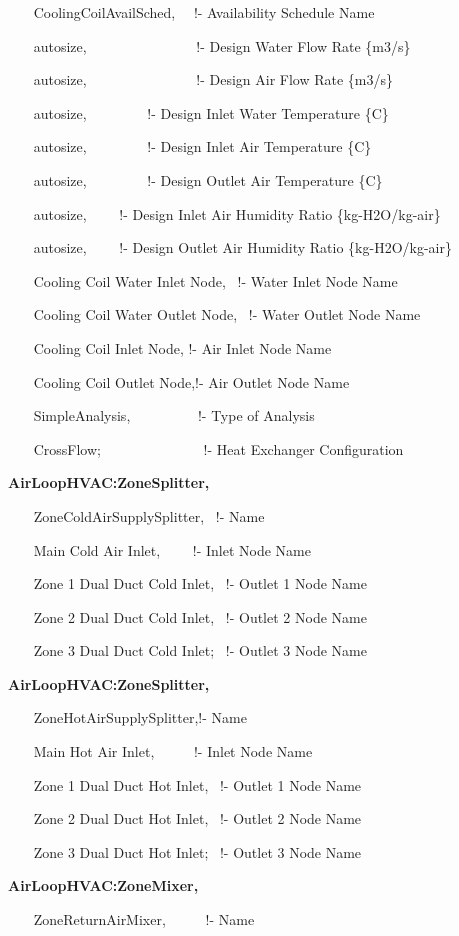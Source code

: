 ~~~ CoolingCoilAvailSched,~~ !- Availability Schedule Name

~~~ autosize,~~~~~~~~~~~~~~~ !- Design Water Flow Rate \{m3/s\}

~~~ autosize,~~~~~~~~~~~~~~~ !- Design Air Flow Rate \{m3/s\}

~~~ autosize,~~~~~~~~ !- Design Inlet Water Temperature \{C\}

~~~ autosize,~~~~~~~~ !- Design Inlet Air Temperature \{C\}

~~~ autosize,~~~~~~~~ !- Design Outlet Air Temperature \{C\}

~~~ autosize,~~~~ !- Design Inlet Air Humidity Ratio \{kg-H2O/kg-air\}

~~~ autosize,~~~~ !- Design Outlet Air Humidity Ratio \{kg-H2O/kg-air\}

~~~ Cooling Coil Water Inlet Node,~ !- Water Inlet Node Name

~~~ Cooling Coil Water Outlet Node,~ !- Water Outlet Node Name

~~~ Cooling Coil Inlet Node, !- Air Inlet Node Name

~~~ Cooling Coil Outlet Node,!- Air Outlet Node Name

~~~ SimpleAnalysis,~~~~~~~~~ !- Type of Analysis

~~~ CrossFlow;~~~~~~~~~~~~~~ !- Heat Exchanger Configuration

\textbf{AirLoopHVAC:ZoneSplitter,}

~~~ ZoneColdAirSupplySplitter,~ !- Name

~~~ Main Cold Air Inlet,~~~~ !- Inlet Node Name

~~~ Zone 1 Dual Duct Cold Inlet,~ !- Outlet 1 Node Name

~~~ Zone 2 Dual Duct Cold Inlet,~ !- Outlet 2 Node Name

~~~ Zone 3 Dual Duct Cold Inlet;~ !- Outlet 3 Node Name

\textbf{AirLoopHVAC:ZoneSplitter,}

~~~ ZoneHotAirSupplySplitter,!- Name

~~~ Main Hot Air Inlet,~~~~~ !- Inlet Node Name

~~~ Zone 1 Dual Duct Hot Inlet,~ !- Outlet 1 Node Name

~~~ Zone 2 Dual Duct Hot Inlet,~ !- Outlet 2 Node Name

~~~ Zone 3 Dual Duct Hot Inlet;~ !- Outlet 3 Node Name

\textbf{AirLoopHVAC:ZoneMixer,}

~~~ ZoneReturnAirMixer,~~~~~ !- Name

